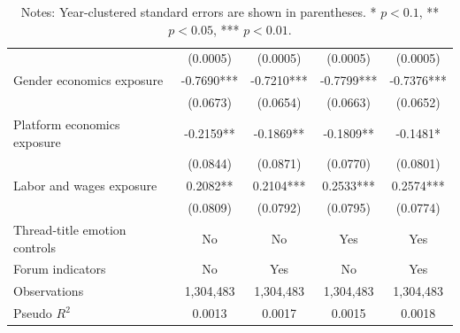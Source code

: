 \documentclass[11pt]{article}
\begin{document}
\begin{table}[!htbp]
{\begin{tabular}{lcccc}
         & (0.0005) & (0.0005) & (0.0005) & (0.0005) \\
        Gender economics exposure & -0.7690*** & -0.7210*** & -0.7799*** & -0.7376*** \\
         & (0.0673) & (0.0654) & (0.0663) & (0.0652) \\
        Platform economics exposure & -0.2159** & -0.1869** & -0.1809** & -0.1481* \\
         & (0.0844) & (0.0871) & (0.0770) & (0.0801) \\
        Labor and wages exposure & 0.2082** & 0.2104*** & 0.2533*** & 0.2574*** \\
         & (0.0809) & (0.0792) & (0.0795) & (0.0774) \\
        \midrule
        Thread-title emotion controls & No & No & Yes & Yes \\
        Forum indicators & No & Yes & No & Yes \\
        Observations & 1,304,483 & 1,304,483 & 1,304,483 & 1,304,483 \\
        Pseudo $R^2$ & 0.0013 & 0.0017 & 0.0015 & 0.0018 \\
        \bottomrule
    \end{tabular}}
    {\captionsetup{justification=raggedright,singlelinecheck=false}
    \caption*{\footnotesize Notes: Year-clustered standard errors are shown in parentheses. * \(p<0.1\), ** \(p<0.05\), *** \(p<0.01\).}}
\end{table}
\end{document}
